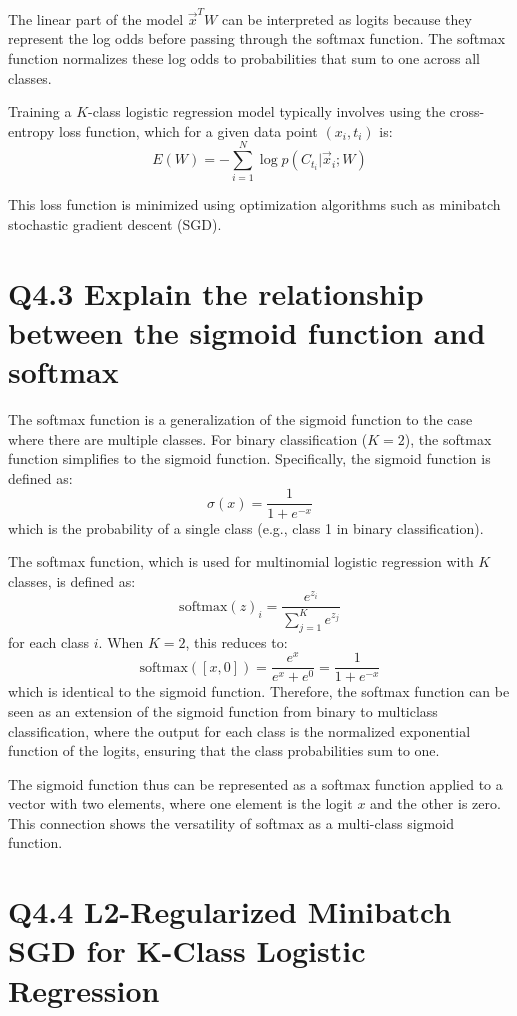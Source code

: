 \documentclass[11pt]{article}
\begin{document}
The linear part of the model \( \vec{x}^TW \) can be interpreted as logits because they represent the log odds before passing through the softmax function. The softmax function normalizes these log odds to probabilities that sum to one across all classes.

Training a \( K \)-class logistic regression model typically involves using the cross-entropy loss function, which for a given data point \( (x_i, t_i) \) is:
\[
E(W) = -\sum_{i=1}^{N} \log p(C_{t_i} | \vec{x}_i; W)
\]

This loss function is minimized using optimization algorithms such as minibatch stochastic gradient descent (SGD).


\section{
Q4.3 Explain the relationship between the sigmoid function and softmax
}

The softmax function is a generalization of the sigmoid function to the case where there are multiple classes. For binary classification (\(K=2\)), the softmax function simplifies to the sigmoid function. Specifically, the sigmoid function is defined as:
\[
\sigma(x) = \frac{1}{1 + e^{-x}}
\]
which is the probability of a single class (e.g., class 1 in binary classification).

The softmax function, which is used for multinomial logistic regression with \(K\) classes, is defined as:
\[
\text{softmax}(z)_i = \frac{e^{z_i}}{\sum_{j=1}^{K} e^{z_j}}
\]
for each class \(i\). When \(K=2\), this reduces to:
\[
\text{softmax}([x, 0]) = \frac{e^x}{e^x + e^0} = \frac{1}{1 + e^{-x}}
\]
which is identical to the sigmoid function. Therefore, the softmax function can be seen as an extension of the sigmoid function from binary to multiclass classification, where the output for each class is the normalized exponential function of the logits, ensuring that the class probabilities sum to one.

The sigmoid function thus can be represented as a softmax function applied to a vector with two elements, where one element is the logit \(x\) and the other is zero. This connection shows the versatility of softmax as a multi-class sigmoid function.

\section{Q4.4 L2-Regularized Minibatch SGD for K-Class Logistic Regression}
\end{document}

